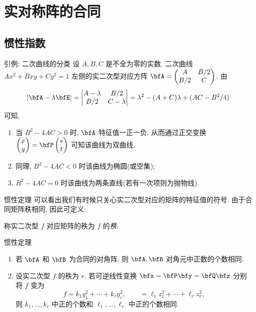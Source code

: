 \section{实对称阵的合同}

\subsection{惯性指数}

\begin{frame}{引例: 二次曲线的分类}
	\onslide<+->
	设 $A,B,C$ 是不全为零的实数.
	二次曲线 $Ax^2+Bxy+Cy^2=1$ 左侧的实二次型对应方阵 $\bfA=\begin{pmatrix}
		A&B/2\\
		B/2&C
	\end{pmatrix}$.
	\onslide<+->
	由
	\[|\bfA-\lambda\bfE|=\begin{vmatrix}
		A-\lambda&B/2\\
		B/2&C-\lambda
	\end{vmatrix}=\lambda^2-(A+C)\lambda+(AC-B^2/4)\]
	可知,
	\begin{enumerate}
		\item 当 $B^2-4AC>0$ 时, $\bfA$ 特征值一正一负, 
		\onslide<+->
		从而通过正交变换 $\begin{pmatrix}
			x\\y
		\end{pmatrix}=\bfP\begin{pmatrix}
			s\\t
		\end{pmatrix}$ 可知该曲线为双曲线.
		\item 同理, $B^2-4AC<0$ 时该曲线为椭圆(或空集);
		\item $B^2-4AC=0$ 时该曲线为两条直线(若有一次项则为抛物线).
	\end{enumerate}
\end{frame}


\begin{frame}{惯性定理}
	\onslide<+->
	可以看出我们有时候只关心实二次型对应的矩阵的特征值的符号.
	\onslide<+->
	由于合同矩阵秩相同, 因此可定义:
	\begin{definition}
		称实二次型 $f$ 对应矩阵的秩为 $f$ 的\emph{秩}.
	\end{definition}
	\onslide<+->
	\begin{algorithm}{惯性定理}
		\begin{enumerate}
			\item 若 $\bfA$ 和 $\bfB$ 为合同的对角阵, 则 $\bfA,\bfB$ 对角元中正数的个数相同.\label{enum:inert-matrix}
			\item \label{enum:inert-quad-form}
			设实二次型 $f$ 的秩为 $r$.
			若可逆线性变换 $\bfx=\bfP\bfy=\bfQ\bfz$ 分别将 $f$ 变为
			\[
				f=k_1y_1^2+\cdots+k_ry_r^2,\qquad
				 =\ell_1z_1^2+\cdots+\ell_rz_r^2,
			\]
			则 $k_1,\dots,k_r$ 中正的个数和 $\ell_1,\dots,\ell_r$ 中正的个数相同.
		\end{enumerate}
	\end{algorithm}
\end{frame}


